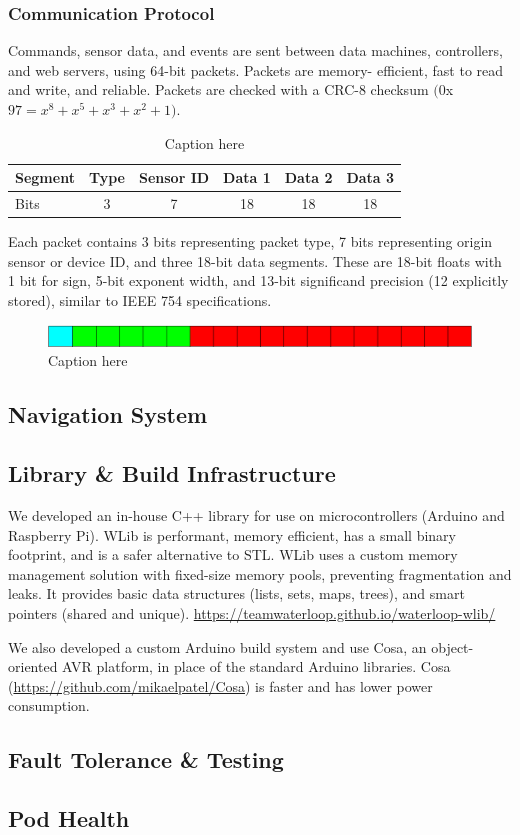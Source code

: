 \documentclass[main.tex]{subfiles}
\begin{document}
    \subsubsection{Communication Protocol}
    Commands, sensor data, and events are sent between data machines, controllers, and web servers, using 64-bit packets. Packets are memory-		efficient, fast to read and write, and reliable. Packets are checked with a CRC-8 checksum $(0$x$97 = x^8 + x^5 + x^3 + x^2 + 1)$.
    \begin{table}[H]
    	\centering
    	\begin{tabular}{@{}lccccc@{}} \toprule
            Segment & Type & Sensor ID & Data 1 & Data 2 & Data 3 \\ \midrule
            Bits & 3 & 7 & 18 & 18 & 18 \\ \bottomrule
        \end{tabular}
        \caption{Caption here}
    \end{table}
    Each packet contains 3 bits representing packet type, 7 bits representing origin sensor or device ID, and three 18-bit data segments. These are 18-bit floats with 1 bit for sign, 5-bit exponent width, and 13-bit significand precision (12 explicitly stored), similar to IEEE 754 specifications.
	\begin{figure}[H]
        \centering
        \includegraphics[width = \textwidth]{images/fig326}
    	\caption{Caption here}
    \end{figure}
    \subsection{Navigation System}
    \subsection{Library \& Build Infrastructure}
    We developed an in-house C++ library for use on microcontrollers (Arduino and Raspberry Pi). WLib is performant, memory efficient, has a small binary footprint, and is a safer alternative to STL. WLib uses a custom memory management solution with fixed-size memory pools, preventing fragmentation and leaks. It provides basic data structures (lists, sets, maps, trees), and smart pointers (shared and unique).
    \url{https://teamwaterloop.github.io/waterloop-wlib/}

    We also developed a custom Arduino build system and use Cosa, an object-oriented AVR platform, in place of the standard Arduino libraries. Cosa (\url{https://github.com/mikaelpatel/Cosa}) is faster and has lower power consumption.
    \subsection{Fault Tolerance \& Testing}
    \subsection{Pod Health}
\end{document}
